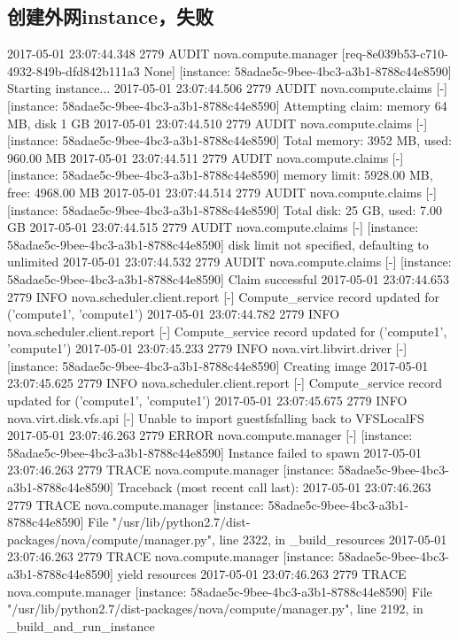\documentclass[a4paper,left=1.5cm,right=1.5cm,11pt]{article}
\begin{document}
\subsection{创建外网instance，失败}
2017-05-01 23:07:44.348 2779 AUDIT nova.compute.manager [req-8e039b53-c710-4932-849b-dfd842b111a3 None] [instance: 58adae5c-9bee-4bc3-a3b1-8788c44e8590] Starting instance...
2017-05-01 23:07:44.506 2779 AUDIT nova.compute.claims [-] [instance: 58adae5c-9bee-4bc3-a3b1-8788c44e8590] Attempting claim: memory 64 MB, disk 1 GB
2017-05-01 23:07:44.510 2779 AUDIT nova.compute.claims [-] [instance: 58adae5c-9bee-4bc3-a3b1-8788c44e8590] Total memory: 3952 MB, used: 960.00 MB
2017-05-01 23:07:44.511 2779 AUDIT nova.compute.claims [-] [instance: 58adae5c-9bee-4bc3-a3b1-8788c44e8590] memory limit: 5928.00 MB, free: 4968.00 MB
2017-05-01 23:07:44.514 2779 AUDIT nova.compute.claims [-] [instance: 58adae5c-9bee-4bc3-a3b1-8788c44e8590] Total disk: 25 GB, used: 7.00 GB
2017-05-01 23:07:44.515 2779 AUDIT nova.compute.claims [-] [instance: 58adae5c-9bee-4bc3-a3b1-8788c44e8590] disk limit not specified, defaulting to unlimited
2017-05-01 23:07:44.532 2779 AUDIT nova.compute.claims [-] [instance: 58adae5c-9bee-4bc3-a3b1-8788c44e8590] Claim successful
2017-05-01 23:07:44.653 2779 INFO nova.scheduler.client.report [-] Compute_service record updated for ('compute1', 'compute1')
2017-05-01 23:07:44.782 2779 INFO nova.scheduler.client.report [-] Compute_service record updated for ('compute1', 'compute1')
2017-05-01 23:07:45.233 2779 INFO nova.virt.libvirt.driver [-] [instance: 58adae5c-9bee-4bc3-a3b1-8788c44e8590] Creating image
2017-05-01 23:07:45.625 2779 INFO nova.scheduler.client.report [-] Compute_service record updated for ('compute1', 'compute1')
2017-05-01 23:07:45.675 2779 INFO nova.virt.disk.vfs.api [-] Unable to import guestfsfalling back to VFSLocalFS
2017-05-01 23:07:46.263 2779 ERROR nova.compute.manager [-] [instance: 58adae5c-9bee-4bc3-a3b1-8788c44e8590] Instance failed to spawn
2017-05-01 23:07:46.263 2779 TRACE nova.compute.manager [instance: 58adae5c-9bee-4bc3-a3b1-8788c44e8590] Traceback (most recent call last):
2017-05-01 23:07:46.263 2779 TRACE nova.compute.manager [instance: 58adae5c-9bee-4bc3-a3b1-8788c44e8590]   File "/usr/lib/python2.7/dist-packages/nova/compute/manager.py", line 2322, in _build_resources
2017-05-01 23:07:46.263 2779 TRACE nova.compute.manager [instance: 58adae5c-9bee-4bc3-a3b1-8788c44e8590]     yield resources
2017-05-01 23:07:46.263 2779 TRACE nova.compute.manager [instance: 58adae5c-9bee-4bc3-a3b1-8788c44e8590]   File "/usr/lib/python2.7/dist-packages/nova/compute/manager.py", line 2192, in _build_and_run_instance
\end{document}
